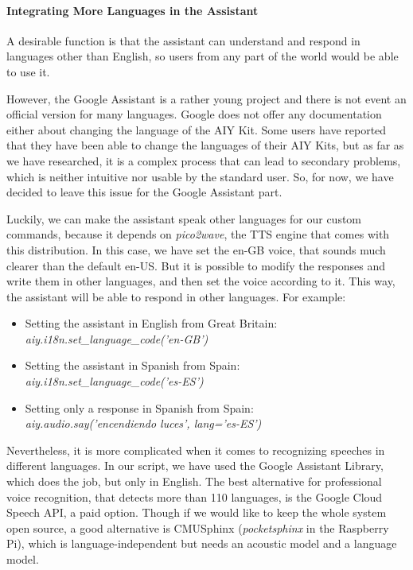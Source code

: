 \paragraph{Integrating More Languages in the Assistant}
A desirable function is that the assistant can understand and respond in languages other than English, so users from any part of
the world would be able to use it.

However, the Google Assistant is a rather young project and there is not event an official version for many languages. Google does
not offer any documentation either about changing the language of the AIY Kit. Some users have reported that they have been able
to change the languages of their AIY Kits, but as far as we have researched, it is a complex process that can lead to secondary
problems, which is neither intuitive nor usable by the standard user. So, for now, we have decided to leave this issue for the Google
Assistant part.

Luckily, we can make the assistant speak other languages for our custom commands, because it depends on \textit{pico2wave}, the TTS
engine that comes with this distribution. In this case, we have set the en-GB voice, that sounds much clearer than the default en-US.
But it is possible to modify the responses and write them in other languages, and then set the voice according to it. This way,
the assistant will be able to respond in other languages. For example:
\begin{itemize}
	\item Setting the assistant in English from Great Britain:\\
		\textit{aiy.i18n.set\_language\_code('en-GB')}
	\item Setting the assistant in Spanish from Spain: \\
		\textit{aiy.i18n.set\_language\_code('es-ES')}
	\item Setting only a response in Spanish from Spain: \\
		\textit{aiy.audio.say('encendiendo luces', lang='es-ES')}
\end{itemize}

Nevertheless, it is more complicated when it comes to recognizing speeches in different languages. In our script, we have used the
Google Assistant Library, which does the job, but only in English. The best alternative for professional voice recognition, that
detects more than 110 languages, is the Google Cloud Speech API, a paid option. Though if we would like to keep the whole system
open source, a good alternative is CMUSphinx\cite{cmusphinxWiki} (\textit{pocketsphinx} in the Raspberry Pi), which is
language-independent but needs an acoustic model and a language model.

